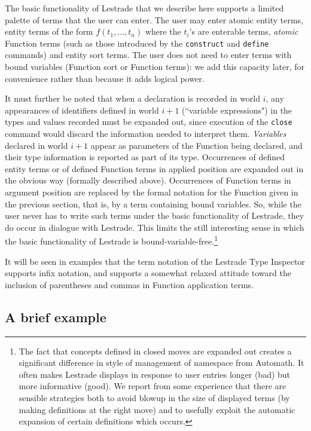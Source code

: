 \documentclass[submission,copyright,creativecommons]{eptcs}
\begin{document}
The basic functionality of Lestrade that we describe here supports a limited palette of terms that the user can enter.  The user may enter atomic entity terms,
entity terms of the form $f(t_1,\ldots,t_n)$ where the $t_i$'s are enterable terms, {\em atomic\/} Function terms (such as those introduced by the {\tt construct} and {\tt define} commands) and entity sort terms.  The user does not need to enter terms with bound variables (Function sort or Function terms):  we add this capacity later, for convenience rather than because it adds logical power. 

It must further be noted that when a declaration is recorded in world $i$, any appearances of identifiers defined in world $i+1$ (``variable expressions") in the types and values recorded must be expanded out, since
execution of the {\tt close} command would discard the information needed to interpret them.  {\em Variables\/} declared in world $i+1$ appear as parameters of the Function being declared, and their type information is reported as part of its type.   Occurrences of defined entity terms or of defined Function terms in applied position are expanded out in the obvious way (formally described above).   Occurrences of Function terms in argument position are replaced by the formal notation for the Function given in the previous section, that is, by a term containing bound variables.  So, while the user never has to write such terms under the basic functionality of Lestrade, they do occur in dialogue with Lestrade.  This limits the still interesting sense in which the basic functionality of Lestrade is bound-variable-free.\footnote{The fact that concepts defined in closed moves are expanded out creates a significant difference in style of management of namespace from Automath.  It often makes Lestrade displays in response to user entries longer (bad) but more informative (good).  We report from some experience that there are sensible strategies both to avoid blowup in the size of displayed terms (by making definitions at the right move) and to usefully  exploit the automatic expansion of certain definitions which occurs.}

It will be seen in examples that the term notation of the Lestrade Type Inspector supports infix notation, and supports a somewhat relaxed attitude toward the inclusion of parentheses and commas in Function application terms.


\subsection{A brief example}
\end{document}
